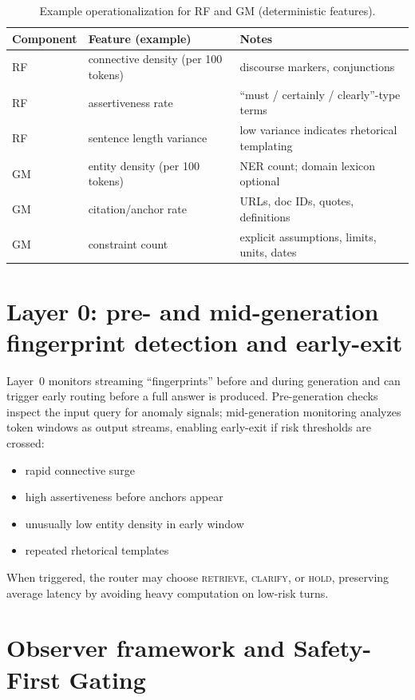 \documentclass[11pt,a4paper]{article}
\begin{document}
\begin{table}[h]
\centering
\caption{Example operationalization for RF and GM (deterministic features).}
\label{tab:features}
\begin{tabular}{@{}lll@{}}
\toprule
Component & Feature (example) & Notes \\
\midrule
RF & connective density (per 100 tokens) & discourse markers, conjunctions \\
RF & assertiveness rate & ``must / certainly / clearly''-type terms \\
RF & sentence length variance & low variance indicates rhetorical templating \\
GM & entity density (per 100 tokens) & NER count; domain lexicon optional \\
GM & citation/anchor rate & URLs, doc IDs, quotes, definitions \\
GM & constraint count & explicit assumptions, limits, units, dates \\
\bottomrule
\end{tabular}
\end{table}

\section{Layer 0: pre- and mid-generation fingerprint detection and early-exit}

Layer~0 monitors streaming ``fingerprints'' before and during generation and can
trigger early routing before a full answer is produced.
Pre-generation checks inspect the input query for anomaly signals; mid-generation
monitoring analyzes token windows as output streams, enabling early-exit if risk
thresholds are crossed:
\begin{itemize}
\item rapid connective surge
\item high assertiveness before anchors appear
\item unusually low entity density in early window
\item repeated rhetorical templates
\end{itemize}
When triggered, the router may choose \textsc{retrieve}, \textsc{clarify}, or
\textsc{hold}, preserving average latency by avoiding heavy computation on low-risk turns.

\section{Observer framework and Safety-First Gating}
\end{document}

